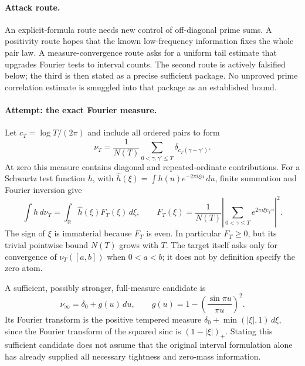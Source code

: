 \documentclass[11pt,a4paper]{article}
\numberwithin{equation}{section}
\newcommand{\R}{\mathbb{R}}
\begin{document}
\paragraph{Attack route.}
An explicit-formula route needs new control of off-diagonal prime sums.
A positivity route hopes that the known low-frequency information fixes
the whole pair law. A measure-convergence route asks for a uniform tail
estimate that upgrades Fourier tests to interval counts. The second route
is actively falsified below; the third is then stated as a precise
sufficient package. No unproved prime correlation estimate is smuggled
into that package as an established bound.

\paragraph{Attempt: the exact Fourier measure.}
Let $c_T=\log T/(2\pi)$ and include all ordered pairs to form
\[
 \nu_T=\frac1{N(T)}\sum_{0<\gamma,\gamma'\leq T}
                          \delta_{c_T(\gamma-\gamma')}.
\]
At zero this measure contains diagonal and repeated-ordinate contributions.
For a Schwartz test function $h$, with
$\widehat h(\xi)=\int h(u)e^{-2\pi i\xi u}\,du$, finite summation and
Fourier inversion give
\begin{equation}\label{eq74:fourier}
 \int h\,d\nu_T=\int_{\R}\widehat h(\xi)F_T(\xi)\,d\xi,
 \qquad
 F_T(\xi)=\frac1{N(T)}
       \left|\sum_{0<\gamma\leq T}e^{2\pi i\xi c_T\gamma}\right|^2.
\end{equation}
The sign of $\xi$ is immaterial because $F_T$ is even. In particular
$F_T\geq0$, but its trivial pointwise bound $N(T)$ grows with $T$.
The target itself asks only for convergence of $\nu_T([a,b])$ when
$0<a<b$; it does not by definition specify the zero atom.

A sufficient, possibly stronger, full-measure candidate is
\[
 \nu_\infty=\delta_0+g(u)\,du,
 \qquad g(u)=1-\left(\frac{\sin\pi u}{\pi u}\right)^2.
\]
Its Fourier transform is the positive tempered measure
$\delta_0+\min(|\xi|,1)\,d\xi$, since the Fourier transform of the squared
sinc is $(1-|\xi|)_+$. Stating this sufficient candidate does not assume
that the original interval formulation alone has already supplied all
necessary tightness and zero-mass information.
\end{document}
